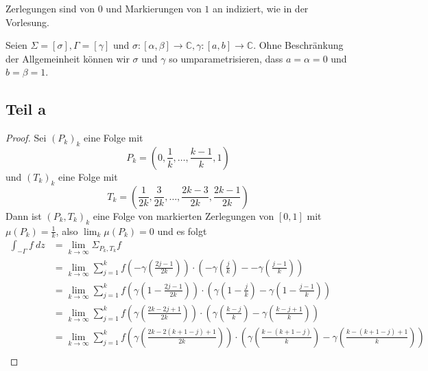 \documentclass[10pt,a4paper]{article}
\begin{document}
Zerlegungen sind von $0$ und Markierungen von $1$ an indiziert, wie in der
Vorlesung.

\noindent
Seien $\Sigma = [\sigma], \Gamma = [\gamma]$ und
$\sigma : [\alpha, \beta] \to \mathbb{C}, \gamma : [a, b] \to \mathbb{C}$. Ohne
Beschränkung der Allgemeinheit können wir $\sigma$ und $\gamma$ so
umparametrisieren, dass $a = \alpha = 0$ und $b = \beta = 1$.

\subsection{Teil a}

\begin{proof}
  Sei $(P_{k})_{k}$ eine Folge mit
  \begin{equation}
    P_{k} = \left( 0, \frac{1}{k}, \dots, \frac{k - 1}{k}, 1 \right)
  \end{equation}
  und $(T_{k})_{k}$ eine Folge mit
  \begin{equation}
    T_{k} = \left( \frac{1}{2k}, \frac{3}{2k}, \dots, \frac{2k - 3}{2k}, \frac{2k - 1}{2k} \right)
  \end{equation}
  Dann ist $(P_{k}, T_{k})_{k}$ eine Folge von markierten Zerlegungen von
  $[0, 1]$ mit $\mu(P_{k}) = \frac{1}{k}$, also $\lim_{k} \mu(P_{k}) = 0$ und es
  folgt
  \begin{align*}
    \int_{-\Gamma} f\ dz & = \lim_{k \to \infty} \Sigma_{P_{k},T_{k}} f\\
                         & = \lim_{k \to \infty} \sum_{j = 1}^{k} f\left( -\gamma\left( \frac{2j - 1}{2k} \right) \right) \cdot \left( -\gamma\left( \frac{j}{k} \right) - -\gamma\left( \frac{j - 1}{k} \right) \right)\\
                         & = \lim_{k \to \infty} \sum_{j = 1}^{k} f\left( \gamma\left( 1 - \frac{2j - 1}{2k} \right) \right) \cdot \left( \gamma\left( 1 - \frac{j}{k} \right) - \gamma\left( 1 - \frac{j - 1}{k} \right) \right)\\
                         & = \lim_{k \to \infty} \sum_{j = 1}^{k} f\left( \gamma\left( \frac{2k - 2j + 1}{2k} \right) \right) \cdot \left( \gamma\left( \frac{k - j}{k} \right) - \gamma\left( \frac{k - j + 1}{k} \right) \right)\\
                         & = \lim_{k \to \infty} \sum_{j = 1}^{k} f\left( \gamma\left( \frac{2k - 2\left( k + 1 - j \right) + 1}{2k} \right) \right) \cdot \left( \gamma\left( \frac{k - \left( k + 1 - j \right)}{k} \right) - \gamma\left( \frac{k - \left( k + 1 - j \right) + 1}{k} \right) \right)\\

\end{align*}
\end{proof}
\end{document}
